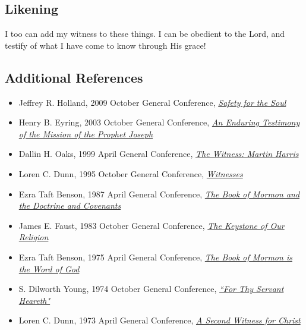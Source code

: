 \documentclass[12pt]{report}
\begin{document}
\subsection{Likening\label{3witness:likening}}
I too can add my witness to these things.  I can be obedient to the Lord, and testify of what I have come to know through His grace!

\subsection{Additional References\label{3witness:references}}
\begin{itemize}
\item Jeffrey R. Holland, 2009 October General Conference, \href{https://www.lds.org/general-conference/2009/10/safety-for-the-soul?lang=eng}{\emph{Safety for the Soul}}
\item Henry B. Eyring, 2003 October General Conference, \href{https://www.lds.org/general-conference/2003/10/an-enduring-testimony-of-the-mission-of-the-prophet-joseph?lang=eng}{\emph{An Enduring Testimony of the Mission of the Prophet Joseph}}
\item Dallin H. Oaks, 1999 April General Conference, \href{https://www.lds.org/general-conference/1999/04/the-witness-martin-harris?lang=eng}{\emph{The Witness: Martin Harris}}
\item Loren C. Dunn, 1995 October General Conference, \href{https://www.lds.org/general-conference/1995/10/witnesses?lang=eng}{\emph{Witnesses}}
\item Ezra Taft Benson, 1987 April General Conference, \href{https://www.lds.org/general-conference/1987/04/the-book-of-mormon-and-the-doctrine-and-covenants?lang=eng}{\emph{The Book of Mormon and the Doctrine and Covenants}}
\item James E. Faust, 1983 October General Conference, \href{https://www.lds.org/general-conference/1983/10/the-keystone-of-our-religion?lang=eng}{\emph{The Keystone of Our Religion}}
\item Ezra Taft Benson, 1975 April General Conference, \href{https://www.lds.org/general-conference/1975/04/the-book-of-mormon-is-the-word-of-god?lang=eng}{\emph{The Book of Mormon is the Word of God}}
\item S. Dilworth Young, 1974 October General Conference, \href{https://www.lds.org/general-conference/1974/10/for-thy-servant-heareth?lang=eng}{\emph{``For Thy Servant Heareth"}}
\item Loren C. Dunn, 1973 April General Conference, \href{https://www.lds.org/general-conference/1973/04/a-second-witness-for-christ?lang=eng}{\emph{A Second Witness for Christ}}

\end{itemize}
\end{document}
